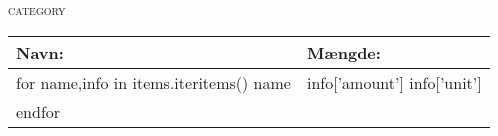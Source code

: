 \begin{center}
\textsc{ {{category}} }

\begin{tabular}{|p{5cm}|p{5cm}|}
  \hline
  \bf{Navn:} & \bf{Mængde:} \\
  \hline\hline
  {{for name,info in items.iteritems()}}
    {{name}} & {{info['amount']}} {{info['unit']}} \\
  {{endfor}}
  \hline
\end{tabular}
\end{center}
